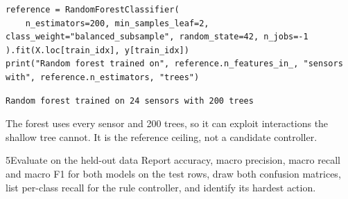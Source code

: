\begin{labanswer}
\begin{lstlisting}[style=utppython]
reference = RandomForestClassifier(
    n_estimators=200, min_samples_leaf=2, class_weight="balanced_subsample", random_state=42, n_jobs=-1
).fit(X.loc[train_idx], y[train_idx])
print("Random forest trained on", reference.n_features_in_, "sensors with", reference.n_estimators, "trees")
\end{lstlisting}
\expectedoutput
\begin{lstlisting}[style=utpterminal]
Random forest trained on 24 sensors with 200 trees
\end{lstlisting}
The forest uses every sensor and 200 trees, so it can exploit interactions the shallow tree cannot. It is the reference ceiling, not a candidate controller.
\end{labanswer}

\begin{labquestion}{5}{Evaluate on the held-out data}
Report accuracy, macro precision, macro recall and macro F1 for both models on the test rows, draw both confusion matrices, list per-class recall for the rule controller, and identify its hardest action.
\end{labquestion}

